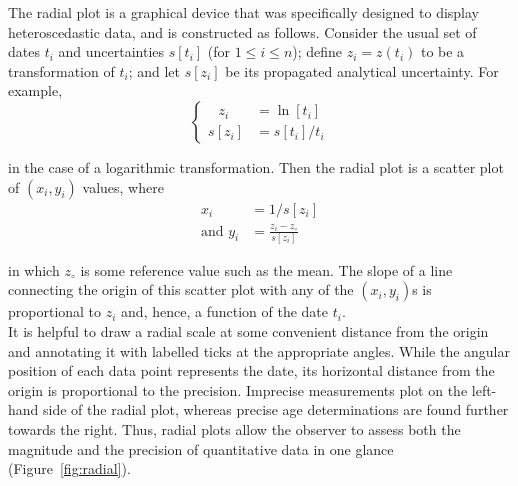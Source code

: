 \begin{refsection}
The radial plot is a graphical device that was specifically designed
to display heteroscedastic data, and is constructed as follows.
Consider the usual set of dates $t_i$ and uncertainties $s[t_i]$ (for
$1 \leq i \leq n$); define $z_i = z(t_i)$ to be a transformation of
$t_i$; and let $s[z_i]$ be its propagated analytical uncertainty.
For example,
\begin{equation}
  \begin{cases}
  \phantom{s[}z_i\phantom{]}\! & \! = \ln[t_i]\\
  s[z_i]\! & \! = s[t_i]/t_i
  \end{cases}
  \label{eq:logtransform}
\end{equation}

\noindent in the case of a logarithmic transformation. Then the radial
plot is a scatter plot of $(x_i,y_i)$ values, where
\begin{equation}
  \begin{split}
    x_i & = 1/s[z_i] \\
    \mbox{and~} y_i & = \frac{z_i-z_\circ}{s[z_i]}
  \end{split}
  \label{eq:radial}
\end{equation}

\noindent in which $z_\circ$ is some reference value such
as the mean. The slope of a line connecting the origin of this scatter
plot with any of the $(x_i,y_i)$s is proportional to $z_i$ and, hence,
a function of the date $t_i$.\\

It is helpful to draw a radial scale at some convenient distance from
the origin and annotating it with labelled ticks at the appropriate
angles. While the angular position of each data point represents the
date, its horizontal distance from the origin is proportional to the
precision. Imprecise measurements plot on the left-hand side of the
radial plot, whereas precise age determinations are found further
towards the right. Thus, radial plots allow the observer to assess
both the magnitude and the precision of quantitative data in one
glance (Figure~\ref{fig:radial}).\\


\end{refsection}
